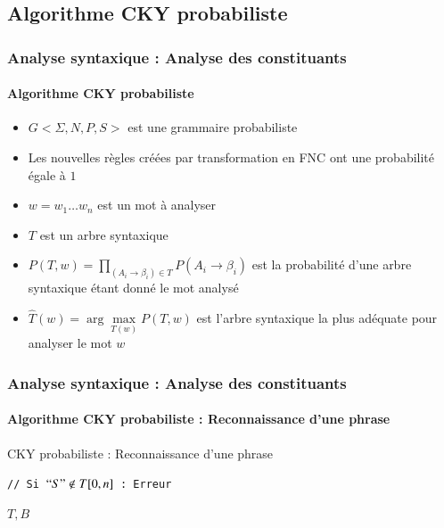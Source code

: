 \documentclass[xcolor=table]{beamer}
\begin{document}
\subsection{Algorithme CKY probabiliste}

\begin{frame}
\frametitle{Analyse syntaxique : Analyse des constituants}
\framesubtitle{Algorithme CKY probabiliste}

\begin{itemize}
	\item $G<\Sigma, N, P, S>$ est une grammaire probabiliste
	\item Les nouvelles règles créées par transformation en FNC ont une probabilité égale à $1$
	\item $w = w_1 \ldots w_n$ est un mot à analyser 
	\item $T$ est un arbre syntaxique 
	\item $P(T, w) = \prod\limits_{(A_i \rightarrow \beta_i) \in T} P(A_i \rightarrow \beta_i)$ est la probabilité d'une arbre syntaxique étant donné le mot analysé
	\item $\hat{T}(w) = \arg\max\limits_{T(w)} P(T, w) $ est l'arbre syntaxique la plus adéquate pour analyser le mot $w$
\end{itemize}

\end{frame}

\begin{frame}
\frametitle{Analyse syntaxique : Analyse des constituants}
\framesubtitle{Algorithme CKY probabiliste : Reconnaissance d'une phrase}

\vspace{-6pt}
\begin{block}{CKY probabiliste : Reconnaissance d'une phrase}
	\scriptsize\vspace{-3pt}
	\begin{algorithm}[H]
		
		
		
		\texttt{// Si $``S" \notin T[0, n] $ : Erreur}
		
		\Retour $T, B$ \;
		\vspace{-3pt}
	\end{algorithm}
\end{block}

\end{frame}
\end{document}
